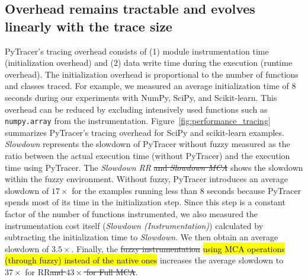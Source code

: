 \documentclass[10pt,journal,compsoc]{IEEEtran}
\newcommand{\pytracer}[0]{PyTracer\xspace}
\DeclareRobustCommand{\add}[1]{\sethlcolor{lightgreen}\hl{#1}}
\DeclareRobustCommand{\remove}[1]{\textcolor{lightred}{\sout{#1}}}
\DeclareRobustCommand{\add}[1]{#1}
\DeclareRobustCommand{\remove}[1]{}
\begin{document}
\subsection{Overhead remains tractable and evolves linearly with the trace size}

\pytracer's tracing overhead consists of (1) module instrumentation time
(initialization overhead) and (2) data write time during the execution (runtime
overhead). The initialization overhead is proportional to the number of
functions and classes traced. For example, we measured an average initialization
time of 8 seconds during our experiments with  NumPy, SciPy, and Scikit-learn.
This overhead can be reduced by excluding intensively used functions such as
\texttt{numpy.array} from the instrumentation.
Figure~\ref{fig:performance_tracing} summarizes \pytracer's tracing overhead for
SciPy and scikit-learn examples. \textit{Slowdown} represents the slowdown of
\pytracer without fuzzy measured as the ratio between the actual execution time
(without \pytracer) and the execution time using \pytracer. The \textit{Slowdown
    RR} \remove{and \textit{Slowdown MCA}} shows the slowdown within the fuzzy environment.
Without fuzzy, \pytracer introduces an average slowdown of $17\times$ for
the examples running less than 8 seconds because \pytracer spends most of its
time in the initialization step. Since this step is a constant factor of the
number of functions instrumented, we also measured the instrumentation cost
itself (\textit{Slowdown (Instrumentation)}) calculated by subtracting the
initialization time to \textit{Slowdown}. We then obtain an average slowdown of
$3.5\times$. Finally, the \remove{fuzzy instrumentation} \add{using MCA
    operations (through fuzzy) instead of the native ones} increases the average
slowdown to $37\times$ for RR\remove{and $43\times$ for Full MCA}.

\end{document}
